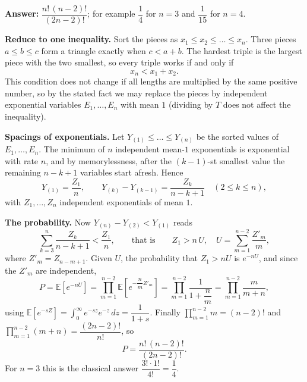 \textbf{Answer:} $\boxed{\dfrac{n!\,(n-2)!}{(2n-2)!}}$; for example $\dfrac{1}{4}$ for $n=3$ and $\dfrac{1}{15}$ for $n=4$.

\textbf{Reduce to one inequality.} Sort the pieces as $x_1\le x_2\le\dots\le x_n$. Three pieces $a\le b\le c$ form a triangle exactly when $c<a+b$. The hardest triple is the largest piece with the two smallest, so every triple works if and only if
\[
x_n<x_1+x_2 .
\]
This condition does not change if all lengths are multiplied by the same positive number, so by the stated fact we may replace the pieces by independent exponential variables $E_1,\dots,E_n$ with mean $1$ (dividing by $T$ does not affect the inequality).

\textbf{Spacings of exponentials.} Let $Y_{(1)}\le\dots\le Y_{(n)}$ be the sorted values of $E_1,\dots,E_n$. The minimum of $n$ independent mean-$1$ exponentials is exponential with rate $n$, and by memorylessness, after the $(k-1)$-st smallest value the remaining $n-k+1$ variables start afresh. Hence
\[
Y_{(1)}=\dfrac{Z_1}{n},\qquad Y_{(k)}-Y_{(k-1)}=\dfrac{Z_k}{n-k+1}\quad(2\le k\le n),
\]
with $Z_1,\dots,Z_n$ independent exponentials of mean $1$.

\textbf{The probability.} Now $Y_{(n)}-Y_{(2)}<Y_{(1)}$ reads
\[
\sum_{k=3}^{n}\dfrac{Z_k}{n-k+1}<\dfrac{Z_1}{n},\qquad\text{that is}\qquad Z_1>n\,U,\quad U=\sum_{m=1}^{n-2}\dfrac{Z'_m}{m},
\]
where $Z'_m=Z_{n-m+1}$. Given $U$, the probability that $Z_1>nU$ is $e^{-nU}$, and since the $Z'_m$ are independent,
\[
P=\mathbb E\left[e^{-nU}\right]=\prod_{m=1}^{n-2}\mathbb E\left[e^{-\dfrac{n}{m}Z'_m}\right]=\prod_{m=1}^{n-2}\dfrac{1}{1+\dfrac{n}{m}}=\prod_{m=1}^{n-2}\dfrac{m}{m+n},
\]
using $\mathbb E[e^{-sZ}]=\displaystyle\int_0^\infty e^{-sz}e^{-z}\,dz=\dfrac{1}{1+s}$. Finally $\displaystyle\prod_{m=1}^{n-2}m=(n-2)!$ and $\displaystyle\prod_{m=1}^{n-2}(m+n)=\dfrac{(2n-2)!}{n!}$, so
\[
P=\dfrac{n!\,(n-2)!}{(2n-2)!}.
\]
For $n=3$ this is the classical answer $\dfrac{3!\cdot1!}{4!}=\dfrac{1}{4}$.

